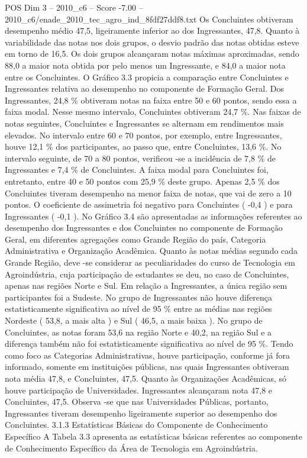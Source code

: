 \begin{textsample}{POS Dim 3 – 2010\_c6 – Score -7.00 – 2010\_c6/enade\_2010\_tec\_agro\_ind\_8fdf27ddf8.txt}
Os Concluintes obtiveram desempenho médio 47,5, ligeiramente inferior ao dos Ingressantes, 47,8.
Quanto à variabilidade das notas nos dois grupos, o desvio padrão das notas obtidas esteve em torno de 16,5.
Os dois grupos alcançaram notas máximas aproximadas, sendo 88,0 a maior nota obtida por pelo menos um Ingressante, e 84,0 a maior nota entre os Concluintes.
O Gráfico 3.3 propicia a comparação entre Concluintes e Ingressantes relativa ao desempenho no componente de Formação Geral.
Dos Ingressantes, 24,8 \% obtiveram notas na faixa entre 50 e 60 pontos, sendo essa a faixa modal.
Nesse mesmo intervalo, Concluintes obtiveram 24,7 \%.
Nas faixas de notas seguintes, Concluintes e Ingressantes se alternam em rendimentos mais elevados.
No intervalo entre 60 e 70 pontos, por exemplo, entre Ingressantes, houve 12,1 \% dos participantes, ao passo que, entre Concluintes, 13,6 \%.
No intervalo seguinte, de 70 a 80 pontos, verificou -se a incidência de 7,8 \% de Ingressantes e 7,4 \% de Concluintes.
A faixa modal para Concluintes foi, entretanto, entre 40 e 50 pontos com 25,9 \% deste grupo.
Apenas 2,5 \% dos Concluintes tiveram desempenho na menor faixa de notas, que vai de zero a 10 pontos.
O coeficiente de assimetria foi negativo para Concluintes ( -0,4 ) e para Ingressantes ( -0,1 ).
No Gráfico 3.4 são apresentadas as informações referentes ao desempenho dos Ingressantes e dos Concluintes no componente de Formação Geral, em diferentes agregações como Grande Região do país, Categoria Administrativa e Organização Acadêmica.
Quanto às notas médias segundo cada Grande Região, deve -se considerar as peculiaridades do curso de Tecnologia em Agroindústria, cuja participação de estudantes se deu, no caso de Concluintes, apenas nas regiões Norte e Sul.
Em relação a Ingressantes, a única região sem participantes foi a Sudeste.
No grupo de Ingressantes não houve diferença estatisticamente significativa ao nível de 95 \% entre as médias nas regiões Nordeste ( 53,8, a mais alta ) e Sul ( 46,5, a mais baixa ).
No grupo de Concluintes, as notas foram 53,6 na região Norte e 40,2, na região Sul e a diferença também não foi estatisticamente significativa ao nível de 95 \%.
Tendo como foco as Categorias Administrativas, houve participação, conforme já fora informado, somente em instituições públicas, nas quais Ingressantes obtiveram nota média 47,8, e Concluintes, 47,5.
Quanto às Organizações Acadêmicas, só houve participação de Universidades.
Ingressantes alcançaram nota 47,8 e Concluintes, 47,5.
Observa -se que nas Universidades Públicas, portanto, Ingressantes tiveram desempenho ligeiramente superior ao desempenho dos Concluintes. 3.1.3 Estatísticas Básicas do Componente de Conhecimento Específico A Tabela 3.3 apresenta as estatísticas básicas referentes ao componente de Conhecimento Específico da Área de Tecnologia em Agroindústria.

\end{textsample}

